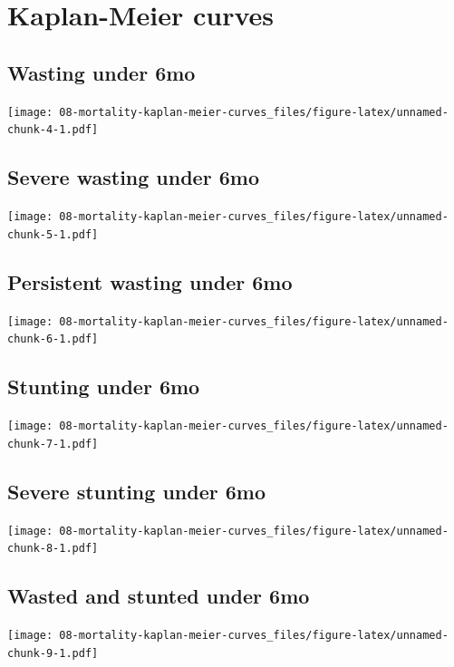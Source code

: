 \documentclass[9pt,]{book}
\begin{document}
\section{Kaplan-Meier curves}\label{kaplan-meier-curves}

\subsection{Wasting under 6mo}\label{wasting-under-6mo}

\texttt{[image: 08-mortality-kaplan-meier-curves\_files/figure-latex/unnamed-chunk-4-1.pdf]}

\subsection{Severe wasting under 6mo}\label{severe-wasting-under-6mo}

\texttt{[image: 08-mortality-kaplan-meier-curves\_files/figure-latex/unnamed-chunk-5-1.pdf]}

\subsection{Persistent wasting under
6mo}\label{persistent-wasting-under-6mo}

\texttt{[image: 08-mortality-kaplan-meier-curves\_files/figure-latex/unnamed-chunk-6-1.pdf]}

\subsection{Stunting under 6mo}\label{stunting-under-6mo}

\texttt{[image: 08-mortality-kaplan-meier-curves\_files/figure-latex/unnamed-chunk-7-1.pdf]}

\subsection{Severe stunting under 6mo}\label{severe-stunting-under-6mo}

\texttt{[image: 08-mortality-kaplan-meier-curves\_files/figure-latex/unnamed-chunk-8-1.pdf]}

\subsection{Wasted and stunted under
6mo}\label{wasted-and-stunted-under-6mo}

\texttt{[image: 08-mortality-kaplan-meier-curves\_files/figure-latex/unnamed-chunk-9-1.pdf]}
\end{document}
